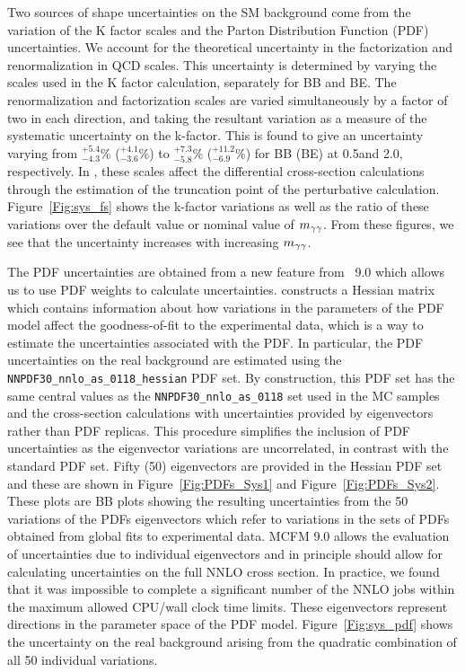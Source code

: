 Two sources of shape uncertainties on the SM background come from the variation of the K factor scales and the Parton Distribution Function (PDF) uncertainties. We account for the theoretical uncertainty in the factorization and renormalization in QCD scales. This uncertainty is determined by varying the scales used in the K factor calculation, separately for BB and BE. The renormalization and factorization scales are varied simultaneously by a factor of two in each direction, and taking the resultant variation as a measure of the systematic uncertainty on the k-factor. This is found to give an uncertainty varying from $^{+5.4}_{-4.3}$\% ($^{+4.1}_{-3.6}$\%) to $^{+7.3}_{-5.8}$\% ($^{+11.2}_{-6.9}$\%) for BB (BE) at 0.5\TeV and 2.0\TeV,
respectively. In \MCFM, these scales affect the differential cross-section calculations through the estimation of the truncation point of the perturbative calculation. Figure~\ref{Fig:sys_fs} shows the k-factor variations as well as the ratio of these variations over the default value or nominal value of $m_{\gamma\gamma}$. From these figures, we see that the uncertainty increases with increasing $m_{\gamma\gamma}$. 

The PDF uncertainties are obtained from a new feature from \MCFM~9.0 which allows us to use PDF weights to calculate uncertainties. \MCFM constructs a Hessian matrix which contains information about how variations in the parameters of the PDF model affect the goodness-of-fit to the experimental data, which is a way to estimate the uncertainties associated with the PDF. In particular, the PDF uncertainties on the real background \mgg are estimated using the \texttt{NNPDF30\_nnlo\_as\_0118\_hessian} PDF set. By construction, this PDF set has the same central values as the \texttt{NNPDF30\_nnlo\_as\_0118} set used in the \SHERPA MC samples and the \MCFM cross-section calculations with uncertainties provided by eigenvectors rather than PDF replicas. This procedure simplifies the inclusion of PDF uncertainties as the eigenvector variations are uncorrelated, in contrast with the standard PDF set. Fifty (50) eigenvectors are provided in the Hessian PDF set and these are shown in Figure~\ref{Fig:PDFs_Sys1} and Figure~\ref{Fig:PDFs_Sys2}. These plots are BB plots showing the resulting uncertainties from the 50 variations of the PDFs eigenvectors which refer to variations in the sets of PDFs obtained from global fits to experimental data. MCFM 9.0 allows the evaluation of uncertainties due to individual eigenvectors and in principle should allow for calculating uncertainties on the full NNLO cross section. In practice, we found that it was impossible to complete a significant number of the NNLO jobs within the maximum allowed CPU/wall clock time limits. These eigenvectors represent directions in the parameter space of the PDF model. Figure~\ref{Fig:sys_pdf} shows the uncertainty on the real background arising from the quadratic combination of all 50 individual variations. 

